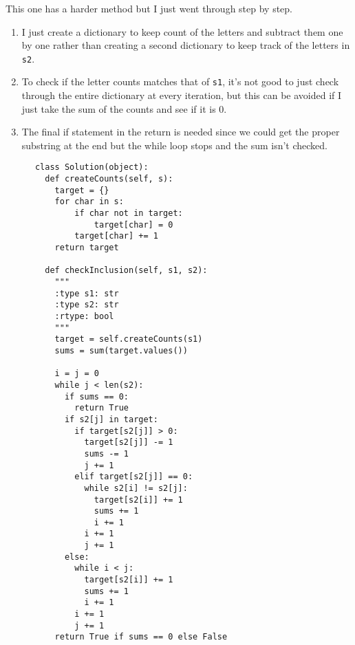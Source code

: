 \documentclass{article}
\begin{document}
  \begin{example}
    This one has a harder method but I just went through step by step. 
    \begin{enumerate}
      \item I just create a dictionary to keep count of the letters and subtract them one by one rather than creating a second dictionary to keep track of the letters in \texttt{s2}. 
      \item To check if the letter counts matches that of \texttt{s1}, it's not good to just check through the entire dictionary at every iteration, but this can be avoided if I just take the sum of the counts and see if it is 0. 
      \item The final if statement in the return is needed since we could get the proper substring at the end but the while loop stops and the sum isn't checked.  
    \end{enumerate}
    \begin{lstlisting}
      class Solution(object):
        def createCounts(self, s): 
          target = {} 
          for char in s: 
              if char not in target: 
                  target[char] = 0 
              target[char] += 1 
          return target

        def checkInclusion(self, s1, s2):
          """
          :type s1: str
          :type s2: str
          :rtype: bool
          """
          target = self.createCounts(s1)
          sums = sum(target.values())

          i = j = 0 
          while j < len(s2): 
            if sums == 0: 
              return True 
            if s2[j] in target:
              if target[s2[j]] > 0: 
                target[s2[j]] -= 1
                sums -= 1 
                j += 1 
              elif target[s2[j]] == 0: 
                while s2[i] != s2[j]: 
                  target[s2[i]] += 1 
                  sums += 1
                  i += 1 
                i += 1 
                j += 1
            else: 
              while i < j: 
                target[s2[i]] += 1 
                sums += 1 
                i += 1  
              i += 1 
              j += 1 
          return True if sums == 0 else False 
    \end{lstlisting}
  \end{example}
\end{document}
